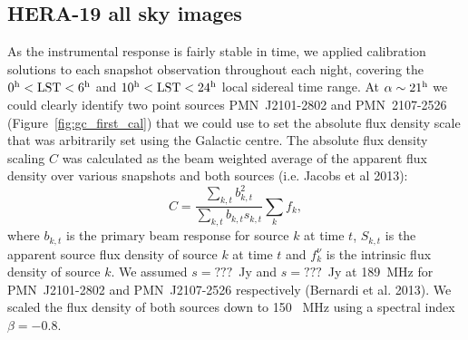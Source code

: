 \documentclass[a0,portrait]{a0poster}
\begin{document}
\begin{multicols}{2}
%

\subsection*{HERA-19 all sky images}
As the instrumental response is fairly stable in time, we applied calibration solutions to each snapshot observation throughout each night, covering the $0^{\rm h} < {\rm LST} < 6^{\rm h}$ and $10^{\rm h} < {\rm LST} < 24^{\rm h}$ local sidereal time range. At $\alpha \sim 21^{\rm h}$ we could clearly identify two point sources PMN~J2101-2802 and PMN~2107-2526 (Figure~\ref{fig:gc_first_cal}) that we could use to set the absolute flux density scale that was arbitrarily set using the Galactic centre. The absolute flux density scaling $C$ was calculated as the beam weighted average of the apparent flux density over various snapshots and both sources (i.e. Jacobs et al 2013):
\begin{equation}
C = \frac{\sum_{k,t} b^2_{k,t}}{\sum_{k,t} b_{k,t} s_{k,t}} \sum_k{f_k},
\label{eq:c}
\end{equation}
where $b_{k,t}$ is the primary beam response for source $k$ at time $t$, $S_{k,t}$ is the apparent source flux density of source $k$ at time $t$ and $f_{k}^{\nu}$ is the intrinsic flux density of source $k$. We assumed $s = ???$~Jy and $s = ???$~Jy at 189~MHz for PMN~J2101-2802 and PMN~J2107-2526 respectively (Bernardi et al. 2013). We scaled the flux density of both sources down to 150 ~MHz using a spectral index $\beta = -0.8$.


\end{multicols}
\end{document}
